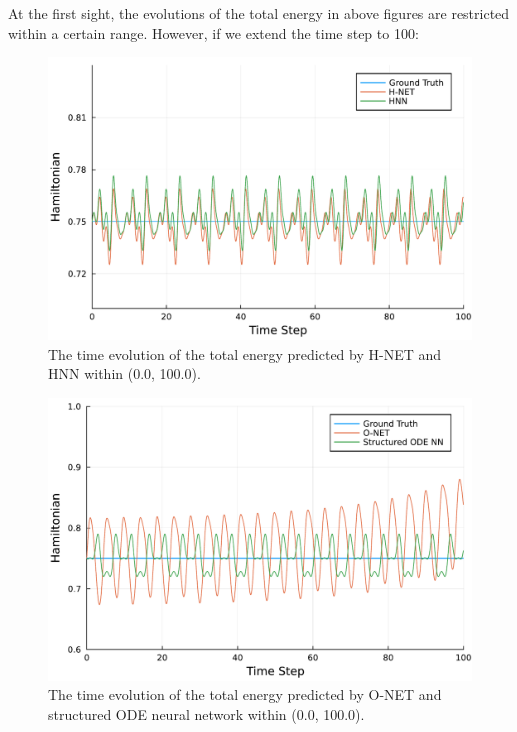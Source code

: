 \documentclass[
	parskip, 			   %
	twoside, 			   %
	DIV=14, 			   %
	BCOR=15.0mm, 		   %
	headsepline, 		   %
	open=right, 		   %
	captions=tableheading, %
	bibliography=totoc,    %
	numbers=noenddot       %
]{scrreprt}
\begin{document}
At the first sight, the evolutions of the total energy in above figures are restricted within a certain range. However, if we extend the time step to 100:

\begin{figure}[h!]
    \centering
    \includegraphics[scale=0.5]{figures/Hamiltonian_evolution_long_H_NET_and_HNN.pdf}
    \caption{The time evolution of the total energy predicted by H-NET and HNN within (0.0, 100.0).}
    \label{fig:Hamiltonian_evolution_long_H_NET_and_HNN}
\end{figure}

\clearpage
\begin{figure}[h!]
    \centering
    \includegraphics[scale=0.5]{figures/Hamiltonian_evolution_long_O_NET_and_structured_ODE_NN.pdf}
    \caption{The time evolution of the total energy predicted by O-NET and structured ODE neural network within (0.0, 100.0).}
    \label{fig:Hamiltonian_evolution_long_O_NET_and_structured_ODE_NN}
\end{figure}
\end{document}
